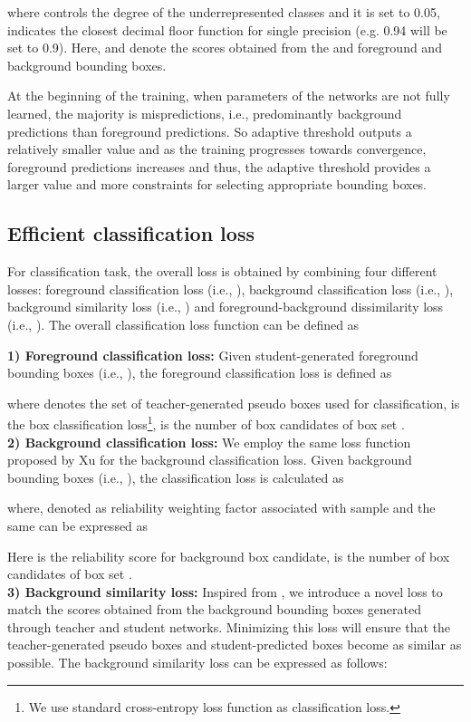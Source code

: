 \documentclass[10pt,twocolumn,letterpaper]{article}
\begin{document}
where  controls the degree of the underrepresented classes and it is set to 0.05,  indicates the closest decimal floor function for single precision (e.g. 0.94 will be set to 0.9). Here,  and  denote the scores obtained from the  and  foreground and background bounding boxes.  

At the beginning of the training, when parameters of the networks are not fully learned, the majority is mispredictions, i.e., predominantly background predictions than foreground predictions. So adaptive threshold outputs a relatively smaller value and as the training progresses towards convergence, foreground predictions increases and thus, the adaptive threshold provides a larger value and more constraints for selecting appropriate bounding boxes. 


\subsection{Efficient classification loss}
For classification task, the overall loss is obtained by combining four different losses: foreground classification loss (i.e., ), background classification loss (i.e., ), background similarity loss (i.e., ) and foreground-background dissimilarity loss (i.e., ). The overall classification loss function can be defined as

\textbf{1) Foreground classification loss:} 
Given student-generated foreground bounding boxes (i.e., ), the foreground classification loss is defined as

where  denotes the set of teacher-generated pseudo boxes used for classification,  is the box classification loss\footnote{We use standard cross-entropy loss function as classification loss.},  is the number of box candidates of box set .\\
\noindent\textbf{2) Background classification loss:} We employ the same loss function proposed by Xu \etal \cite{xu2021end} for the background classification loss. Given background bounding boxes (i.e., ), the classification loss is calculated as

where,  denoted as reliability weighting factor associated with  sample and the same can be expressed as 

Here  is the reliability score for  background box candidate,  is the number of box candidates of box set . 
\\
\textbf{3) Background similarity loss:} Inspired from \cite{riemannian}, we introduce a novel loss to match the scores obtained from the background bounding boxes generated through teacher and student networks. Minimizing this loss will ensure that the teacher-generated pseudo boxes and student-predicted boxes become as similar as possible. The background similarity loss can be expressed as follows:
\end{document}
